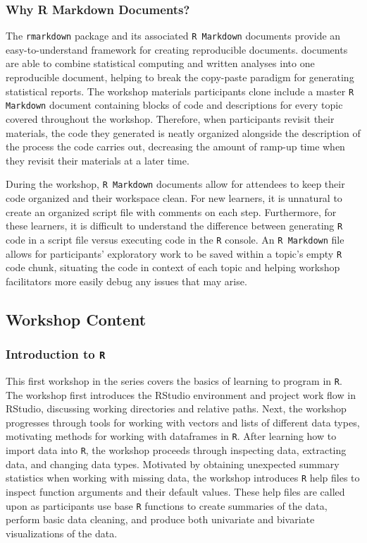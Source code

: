 \documentclass[12pt]{article}
\begin{document}
\subsubsection{Why R Markdown Documents?}

\quad The \texttt{rmarkdown} package \citep{rmarkdown} and its associated \texttt{R Markdown} documents provide an easy-to-understand framework for creating reproducible documents.  documents are able to combine statistical computing and written analyses into one reproducible document, helping to break the copy-paste paradigm for generating statistical reports. The workshop materials participants clone include a master \texttt{R Markdown} document containing blocks of code and descriptions for every topic covered throughout the workshop. Therefore, when participants revisit their materials, the code they generated is neatly organized alongside the description of the process the code carries out, decreasing the amount of ramp-up time when they revisit their materials at a later time. 

\quad During the workshop, \texttt{R Markdown} documents allow for attendees to keep their code organized and their workspace clean. For new learners, it is unnatural to create an organized script file with comments on each step. Furthermore, for these learners, it is difficult to understand the difference between generating \texttt{R} code in a script file versus executing code in the \texttt{R} console. An \texttt{R Markdown} file allows for participants' exploratory work to be saved within a topic's empty \texttt{R} code chunk, situating the code in context of each topic and helping workshop facilitators more easily debug any issues that may arise.   

\subsection{Workshop Content}

\subsubsection{Introduction to \texttt{R}}
\label{sec:introR}

\quad This first workshop in the series covers the basics of learning to program in \texttt{R}. The workshop first introduces the RStudio environment and project work flow in RStudio, discussing working directories and relative paths. Next, the workshop progresses through tools for working with vectors and lists of different data types, motivating methods for working with dataframes in \texttt{R}. After learning how to import data into \texttt{R}, the workshop proceeds through inspecting data, extracting data, and changing data types. Motivated by obtaining unexpected summary statistics when working with missing data, the workshop introduces \texttt{R} help files to inspect function arguments and their default values. These help files are called upon as participants use base \texttt{R} functions to create summaries of the data, perform basic data cleaning, and produce both univariate and bivariate visualizations of the data. 
\end{document}
